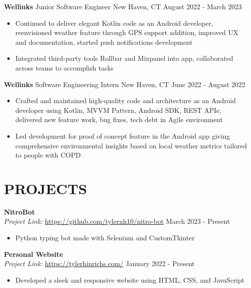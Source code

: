 \documentclass[a4paper,10pt]{extarticle}
\begin{document}
\noindent
\textbf{Wellinks} \textbar \space Junior Software Engineer \hfill New Haven, CT \textbar \space August 2022 - March 2023 %
\begin{itemize}
    \item Continued to deliver elegant Kotlin code as an Android developer, reenvisioned weather feature through GPS support addition, improved UX and documentation, started push notifications development
    \item Integrated third-party tools Rollbar and Mixpanel into app, collaborated across teams to accomplish tasks %
\end{itemize}

\noindent
\textbf{Wellinks} \textbar \space Software Engineering Intern \hfill New Haven, CT \textbar \space June 2022 - August 2022 %
\begin{itemize}
    \item Crafted and maintained high-quality code and architecture as an Android developer using Kotlin, MVVM Pattern, Android SDK, REST APIs; delivered new feature work, bug fixes, tech debt in Agile environment %
    \item Led development for proof of concept feature in the Android app giving comprehensive environmental insights based on local weather metrics tailored to people with COPD

\end{itemize}

\section*{PROJECTS}
\noindent
\textbf{NitroBot}\\ %
\textit{Project Link:} \url{https://github.com/tylernh10/nitro-bot} \hfill March 2023 - Present %
\begin{itemize}[topsep=3pt]
    \item Python typing bot made with Selenium and CustomTkinter %
\end{itemize}

\noindent
\textbf{Personal Website}\\ %
\textit{Project Link:} \url{https://tylerhinrichs.com/} \hfill January 2022 - Present %
\begin{itemize}[topsep=3pt]
    \item Developed a sleek and responsive website using HTML, CSS, and JavaScript %
\end{itemize}
\end{document}
